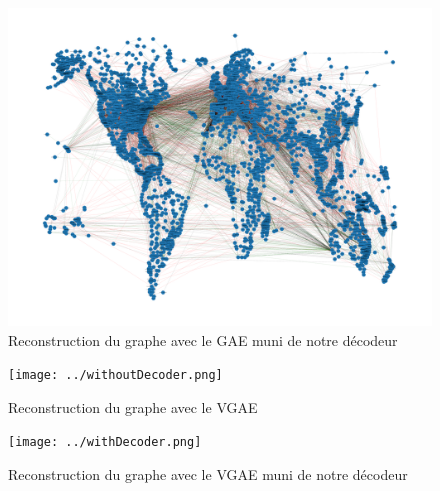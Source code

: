 \documentclass{article}
\begin{document}
\begin{figure}[H]
    \centering
    \includegraphics[width=1\linewidth]{../GCNwithDecoder.png}
    \caption{Reconstruction du graphe avec le GAE muni de notre décodeur}
    \label{fig:fig_graphe_GAE_with_decodeur}
\end{figure}

\begin{figure}[H]
    \centering
    \texttt{[image: ../withoutDecoder.png]}
    \caption{Reconstruction du graphe avec le VGAE}
    \label{fig:fig_graphe_VGAE}
\end{figure}

\begin{figure}[H]
    \centering
    \texttt{[image: ../withDecoder.png]}
    \caption{Reconstruction du graphe avec le VGAE muni de notre décodeur}
    \label{fig:fig_graphe_VGAE_with_decodeur}
\end{figure}
\end{document}
